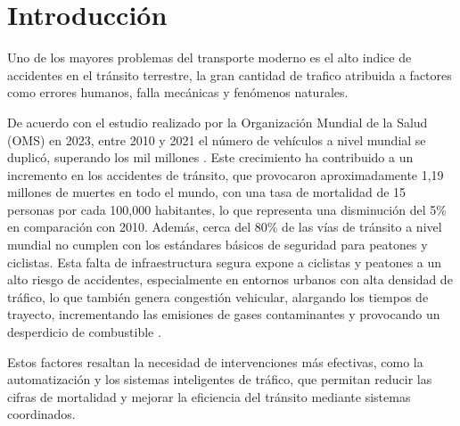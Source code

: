 \documentclass[conference]{IEEEtran}
\begin{document}
\section{Introducción}
Uno de los mayores problemas del transporte moderno es el alto indice de accidentes en el tránsito terrestre, la gran cantidad de trafico atribuida a factores como errores humanos, falla mecánicas y fenómenos naturales. 

De acuerdo con el estudio realizado por la Organización Mundial de la Salud (OMS) en 2023, entre 2010 y 2021 el número de vehículos a nivel mundial se duplicó, superando los mil millones \cite{Accidentes}. Este crecimiento ha contribuido a un incremento en los accidentes de tránsito, que provocaron aproximadamente 1,19 millones de muertes en todo el mundo, con una tasa de mortalidad de 15 personas por cada 100,000 habitantes, lo que representa una disminución del 5\% en comparación con 2010. Además, cerca del 80\% de las vías de tránsito a nivel mundial no cumplen con los estándares básicos de seguridad para peatones y ciclistas. Esta falta de infraestructura segura expone a ciclistas y peatones a un alto riesgo de accidentes, especialmente en entornos urbanos con alta densidad de tráfico, lo que también genera congestión vehicular, alargando los tiempos de trayecto, incrementando las emisiones de gases contaminantes y provocando un desperdicio de combustible \cite{montezuma2008derecho, diaz2015infraestructuras}.

Estos factores resaltan la necesidad de intervenciones más efectivas, como la automatización y los sistemas inteligentes de tráfico, que permitan reducir las cifras de mortalidad y mejorar la eficiencia del tránsito mediante sistemas coordinados.
\end{document}
